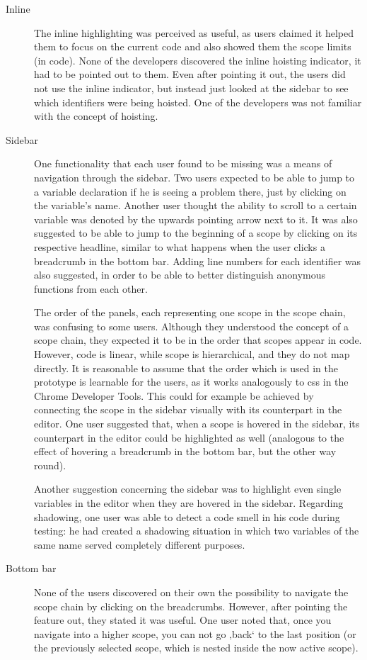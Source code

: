 \begin{description}
\item[Inline]
The inline highlighting was perceived as useful, as users claimed it
helped them to focus on the current code and also showed them the scope
limits (in code). None of the developers discovered the inline hoisting
indicator, it had to be pointed out to them. Even after pointing it out,
the users did not use the inline indicator, but instead just looked at
the sidebar to see which identifiers were being hoisted. One of the
developers was not familiar with the concept of hoisting.
\item[Sidebar]
One functionality that each user found to be missing was a means of
navigation through the sidebar. Two users expected to be able to jump to
a variable declaration if he is seeing a problem there, just by clicking
on the variable’s name. Another user thought the ability to scroll to a
certain variable was denoted by the upwards pointing arrow next to it.
It was also suggested to be able to jump to the beginning of a scope by
clicking on its respective headline, similar to what happens when the
user clicks a breadcrumb in the bottom bar. Adding line numbers for each
identifier was also suggested, in order to be able to better distinguish
anonymous functions from each other.

The order of the panels, each representing one scope in the scope chain,
was confusing to some users. Although they understood the concept of a
scope chain, they expected it to be in the order that scopes appear in
code. However, code is linear, while scope is hierarchical, and they do
not map directly. It is reasonable to assume that the order which is
used in the prototype is learnable for the users, as it works
analogously to \ac{css} in the Chrome Developer Tools. This could for
example be achieved by connecting the scope in the sidebar visually with
its counterpart in the editor. One user suggested that, when a scope is
hovered in the sidebar, its counterpart in the editor could be
highlighted as well (analogous to the effect of hovering a breadcrumb in
the bottom bar, but the other way round).

Another suggestion concerning the sidebar was to highlight even single
variables in the editor when they are hovered in the sidebar. Regarding
shadowing, one user was able to detect a code smell in his code during
testing: he had created a shadowing situation in which two variables of
the same name served completely different purposes.
\item[Bottom bar]
None of the users discovered on their own the possibility to navigate
the scope chain by clicking on the breadcrumbs. However, after pointing
the feature out, they stated it was useful. One user noted that, once
you navigate into a higher scope, you can not go ‚back‘ to the last
position (or the previously selected scope, which is nested inside the
now active scope).


\end{description}
